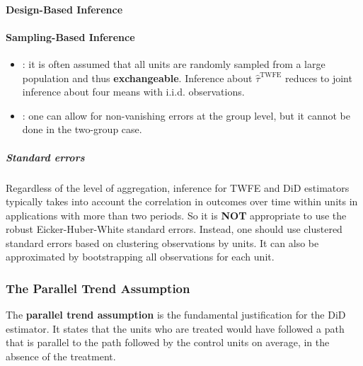 \documentclass[twoside]{article}
\begin{document}
\paragraph*{Design-Based Inference}


\paragraph*{Sampling-Based Inference}
\begin{itemize}
    \item {}: it is often assumed that all units are randomly sampled from a large population and thus \textbf{exchangeable}. Inference about $\hat{\tau}^{\mathrm{TWFE}}$ reduces to joint inference about four means with i.i.d. observations.
    \item {}: one can allow for non-vanishing errors at the group level, but it cannot be done in the two-group case.
\end{itemize}

\subparagraph*{Standard errors}
Regardless of the level of aggregation, inference for TWFE and DiD estimators typically takes into account the correlation in outcomes over time within units in applications with more than two periods. So it is \textbf{NOT} appropriate to use the robust Eicker-Huber-White standard errors. 
Instead, one should use clustered standard errors based on clustering observations by units. It can also be approximated by bootstrapping all observations for each unit.

\subsubsection{The Parallel Trend Assumption}

The \textbf{parallel trend assumption} is the fundamental justification for the DiD estimator. It states that the units who are treated would have followed a path that is parallel to the path followed by the control units on average, in the absence of the treatment.
\end{document}
